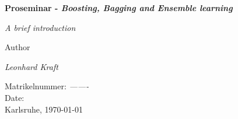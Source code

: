 \begin{titlepage}
\begin{center}
	\vspace{3em}	
    {\Huge\bfseries Proseminar - \textit{Boosting, Bagging and Ensemble learning}\par}
    \vspace{2em}
    {\huge \textit{A brief introduction} \par}
    \vspace{3em}
    Author\\
	\vspace{1em}
    {\Large \textit{Leonhard Kraft}\par}
    \vspace{1em}
    Matrikelnummer: \textit{-------}\\
    \vspace{3em}
    Date:\\
	\vspace{1em}
    Karlsruhe, \today
\end{center}
\end{titlepage}